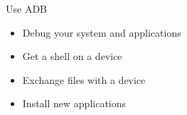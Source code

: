 \setuplabframe
{Use ADB}
{
  \begin{itemize}
  \item Debug your system and applications
  \item Get a shell on a device
  \item Exchange files with a device
  \item Install new applications
  \end{itemize}
}